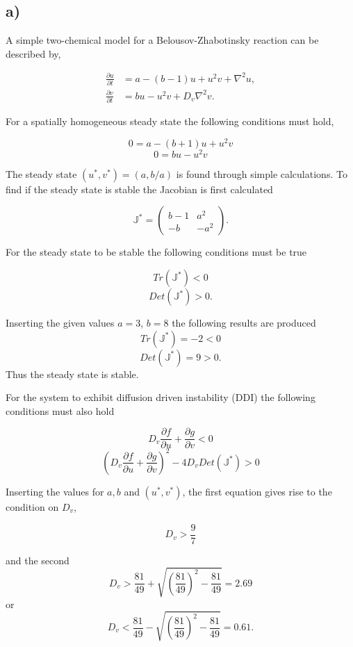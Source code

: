\subsection*{a)}

A simple two-chemical model for a Belousov-Zhabotinsky reaction can be described by,

\begin{align}
\label{eq:2a}
\frac{\partial u}{\partial t}& = a - (b-1)u + u^2v + \nabla^2 u,\\
\frac{\partial v}{\partial t}& = bu - u^2v + D_v \nabla^2 v.
\end{align}

For a spatially homogeneous steady state the following conditions must hold,

$$0 = a - (b+1)u + u^2v$$
$$0 = bu - u^2v$$

The steady state $(u^*,v^*)=(a,b/a)$ is found through simple calculations. To find if the steady state is stable the Jacobian is first calculated

\begin{equation}
\mathbb{J}^* = \left(
\begin{array}{cc}
    b-1 & a^2 \\
    -b  & -a^2
\end{array}
\right).
\end{equation}

For the steady state to be stable the following conditions must be true

$$Tr(\mathbb{J}^*) < 0$$
$$Det(\mathbb{J}^*) > 0.$$

Inserting the given values $a=3$, $b=8$ the following results are produced
$$Tr(\mathbb{J}^*) = -2 < 0$$
$$Det(\mathbb{J}^*) = 9 > 0.$$
Thus the steady state is stable.

For the system to exhibit diffusion driven instability (DDI) the following conditions must also hold

$$D_v \frac{\partial f}{\partial u} + \frac{\partial g}{\partial v} < 0$$
$$(D_v \frac{\partial f}{\partial u}+ \frac{\partial g}{\partial v})^2 - 4D_v Det(\mathbb{J}^*) > 0$$

Inserting the values for $a, b$ and $(u^*, v^*)$, the first equation gives rise to the condition on $D_v$,

$$D_v > \frac{9}{7}$$

and the second
$$D_v > \frac{81}{49} + \sqrt{\left(\frac{81}{49}\right)^2 - \frac{81}{49}} = 2.69$$
or
$$D_v < \frac{81}{49} - \sqrt{\left(\frac{81}{49}\right)^2 - \frac{81}{49}} = 0.61.$$

